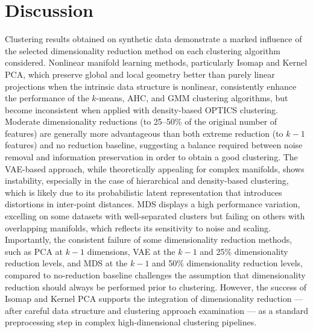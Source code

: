 \documentclass[preprint,12pt]{elsarticle}
\begin{document}
\section{Discussion}\label{sec:discussion}
Clustering results obtained on synthetic data demonstrate a marked influence of the selected dimensionality reduction method on each clustering algorithm considered. Nonlinear manifold learning methods, particularly Isomap and Kernel PCA, which preserve global and local geometry better than purely linear projections when the intrinsic data structure is nonlinear, consistently enhance the performance of the $k$-means, AHC, and GMM clustering algorithms, but become inconsistent when applied with density-based OPTICS clustering. Moderate dimensionality reductions (to 25–50\% of the original number of features) are generally more advantageous than both extreme reduction (to $k-1$ features) and no reduction baseline, suggesting a balance required between noise removal and information preservation in order to obtain a good clustering. The VAE-based approach, while theoretically appealing for complex manifolds, shows instability, especially in the case of hierarchical and density-based clustering, which is likely due to its probabilistic latent representation that introduces distortions in inter-point distances. MDS displays a high performance variation, excelling on some datasets with well-separated clusters but failing on others with overlapping manifolds, which reflects its sensitivity to noise and scaling. Importantly, the consistent failure of some dimensionality reduction methods, such as PCA at $k-1$ dimensions, VAE at the $k-1$ and 25\% dimensionality reduction levels, and MDS at the $k-1$ and 50\% dimensionality reduction levels, compared to no-reduction baseline challenges the assumption that dimensionality reduction should always be performed prior to clustering. However, the success of Isomap and Kernel PCA supports the integration of dimensionality reduction — after careful data structure and clustering approach examination — as a standard preprocessing step in complex high-dimensional clustering pipelines.
\end{document}
